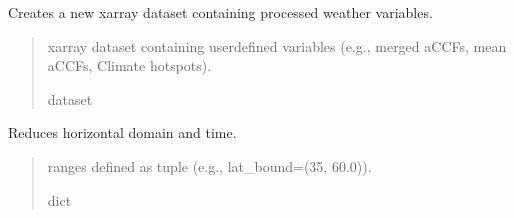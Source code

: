 \documentclass[a4paper,11pt,english]{sphinxmanual}
\begin{document}
\begin{fulllineitems}
\begin{fulllineitems}
\label{\detokenize{modules:envlib.weather_store.WeatherStore.get_xarray}}
\pysigstartsignatures
{}
\pysigstopsignatures
\sphinxAtStartPar
Creates a new xarray dataset containing processed weather variables.
\begin{quote}\begin{description}
\sphinxAtStartPar
xarray dataset containing user\sphinxhyphen{}defined variables (e.g., merged aCCFs, mean aCCFs, Climate hotspots).

\sphinxAtStartPar
dataset

\end{description}\end{quote}

\end{fulllineitems}


\begin{fulllineitems}
\label{\detokenize{modules:envlib.weather_store.WeatherStore.reduce_domain}}
\pysigstartsignatures
{}
\pysigstopsignatures
\sphinxAtStartPar
Reduces horizontal domain and time.
\begin{quote}\begin{description}
\sphinxAtStartPar
{} \textendash{} ranges defined as tuple (e.g., lat\_bound=(35, 60.0)).

\sphinxAtStartPar
dict

\end{description}\end{quote}

\end{fulllineitems}


\end{fulllineitems}

\label{\detokenize{modules:module-envlib.weather_store}}
\end{document}
